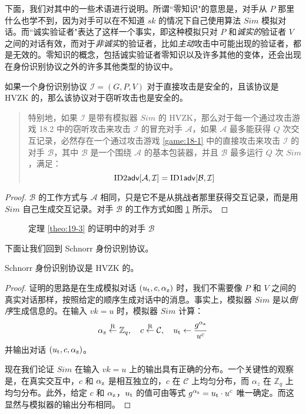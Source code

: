 下面，我们对其中的一些术语进行说明。所谓``零知识"的意思是，对手从 $P$ 那里什么也学不到，因为对手可以在不知道 $sk$ 的情况下自己使用算法 $Sim$ 模拟对话。而``诚实验证者"表达了这样一个事实，即这种模拟只对 $P$ 和\emph{诚实的}验证者 $V$ 之间的对话有效，而对于\emph{非诚实}的验证者，比如\emph{主动}攻击中可能出现的验证者，都是无效的。零知识的概念，包括诚实验证者零知识以及许多其他的变体，还会出现在身份识别协议之外的许多其他类型的协议中。

\begin{theorem}\label{theo:19-3}
	如果一个身份识别协议 $\mathcal{I}=(G,P,V)$ 对于直接攻击是安全的，且该协议是 HVZK 的，那么该协议对于窃听攻击也是安全的。
	\begin{quote}
		特别地，如果 $\mathcal{I}$ 是带有模拟器 ${Sim}$ 的 HVZK，那么对于每一个通过攻击游戏 18.2 中的窃听攻击来攻击 $\mathcal{I}$ 的冒充对手 $\mathcal{A}$，如果 $\mathcal{A}$ 最多能获得 $Q$ 次交互记录，必然存在一个通过攻击游戏 \ref{game:18-1} 中的直接攻击来攻击 $\mathcal{I}$ 的对手 $\mathcal{B}$，其中 $\mathcal{B}$ 是一个围绕 $\mathcal{A}$ 的基本包装器，并且 $\mathcal{B}$ 最多运行 $Q$ 次 ${Sim}$，满足：
		\[
		{\rm ID2\mathsf{adv}}[\mathcal{A},\mathcal{I}]={\rm ID1\mathsf{adv}}[\mathcal{B},\mathcal{I}]
		\]
	\end{quote}
\end{theorem}

\begin{proof}
	$\mathcal{B}$ 的工作方式与 $\mathcal{A}$ 相同，只是它不是从挑战者那里获得交互记录，而是用 ${Sim}$ 自己生成交互记录。对手 $\mathcal{B}$ 的工作方式如图 \ref{fig:19-2} 所示。
\end{proof}

\begin{figure}
  \centering
  
  \caption{定理 \ref{theo:19-3} 的证明中的对手 $\mathcal{B}$}
  \label{fig:19-2}
\end{figure}

下面让我们回到 Schnorr 身份识别协议。

\begin{theorem}\label{theo:19-4}
	Schnorr 身份识别协议是 HVZK 的。
\end{theorem}

\begin{proof}
	证明的思路是在生成模拟对话 $(u_{\rm t},c,\alpha_{\rm z})$ 时，我们不需要像 $P$ 和 $V$ 之间的真实对话那样，按照给定的顺序生成对话中的消息。事实上，模拟器 ${Sim}$ 是以\emph{倒序}生成信息的。在输入 $vk=u$ 时，模拟器 ${Sim}$ 计算：
		\[
		\alpha_{\rm z}\overset{\rm R}\leftarrow\mathbb{Z}_q,
		\quad
		c\overset{\rm R}\leftarrow\mathcal{C},
		\quad
		u_{\rm t}\leftarrow\frac{g^{\alpha_{\rm z}}}{u^c}
		\]
	并输出对话 $(u_{\rm t},c,\alpha_{\rm z})$。
	
	现在我们论证 ${Sim}$ 在输入 $vk=u$ 上的输出具有正确的分布。一个关键性的观察是，在真实交互中，$c$ 和 $\alpha_{\rm z}$ 是相互独立的，$c$ 在 $\mathcal{C}$ 上均匀分布，而 $\alpha_z$ 在 $\mathbb{Z}_q$ 上均匀分布。此外，给定 $c$ 和 $\alpha_{\rm z}$，$u_{\rm t}$ 的值可由等式 $g^{\alpha_{\rm z}}=u_{\rm t}\cdot u^c$ 唯一确定。而这显然与模拟器的输出分布相同。
\end{proof}


